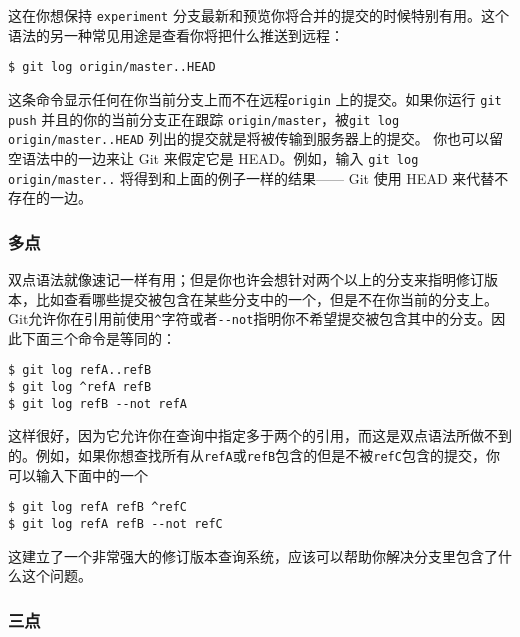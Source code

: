\documentclass[a4paper]{book}
\begin{document}
这在你想保持 \texttt{experiment} 分支最新和预览你将合并的提交的时候特别有用。这个语法的另一种常见用途是查看你将把什么推送到远程：

\begin{shaded}\begin{verbatim}
$ git log origin/master..HEAD
\end{verbatim}\end{shaded}

这条命令显示任何在你当前分支上而不在远程\texttt{origin} 上的提交。如果你运行 \texttt{git push} 并且的你的当前分支正在跟踪 \texttt{origin/master}，被\texttt{git log origin/master..HEAD} 列出的提交就是将被传输到服务器上的提交。 你也可以留空语法中的一边来让 Git 来假定它是 HEAD。例如，输入 \texttt{git log origin/master..} 将得到和上面的例子一样的结果------ Git 使用 HEAD 来代替不存在的一边。

\subsubsection{多点}

双点语法就像速记一样有用；但是你也许会想针对两个以上的分支来指明修订版本，比如查看哪些提交被包含在某些分支中的一个，但是不在你当前的分支上。Git允许你在引用前使用\texttt{\^{}}字符或者\texttt{-{}-not}指明你不希望提交被包含其中的分支。因此下面三个命令是等同的：

\begin{shaded}\begin{verbatim}
$ git log refA..refB
$ git log ^refA refB
$ git log refB --not refA
\end{verbatim}\end{shaded}

这样很好，因为它允许你在查询中指定多于两个的引用，而这是双点语法所做不到的。例如，如果你想查找所有从\texttt{refA}或\texttt{refB}包含的但是不被\texttt{refC}包含的提交，你可以输入下面中的一个

\begin{shaded}\begin{verbatim}
$ git log refA refB ^refC
$ git log refA refB --not refC
\end{verbatim}\end{shaded}

这建立了一个非常强大的修订版本查询系统，应该可以帮助你解决分支里包含了什么这个问题。

\subsubsection{三点}
\end{document}
